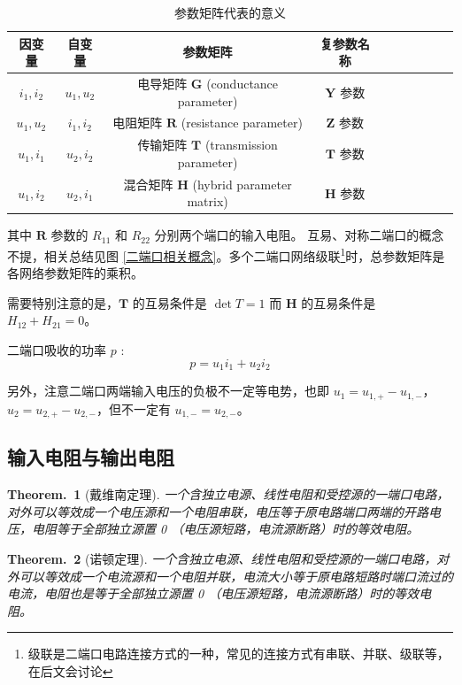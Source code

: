 \documentclass[UTF8]{report}
\theoremstyle{MyLineTheoremStyle} %
\newtheorem{LineTheorem}{Theorem.\,}
\theoremstyle{MyBlockTheoremStyle} %
\theoremstyle{MySubsubsectionStyle} %
\begin{document}
\begin{table}[H]\centering
    \caption{参数矩阵代表的意义}
    \label{参数矩阵代表的意义}
\begin{tabular}{cccccccccc}\toprule
    因变量& 自变量 & 参数矩阵 & 复参数名称\\
    \midrule
    $i_1, i_2$ & $u_1, u_2$ & 电导矩阵 $\boldsymbol{G}$ (conductance parameter) & $\boldsymbol{Y}$ 参数\\
    $u_1, u_2$ & $i_1, i_2$ & 电阻矩阵 $\boldsymbol{R}$ (resistance parameter) & $\boldsymbol{Z}$ 参数\\
    $u_1, i_1$& $u_2, i_2$&  传输矩阵 $\boldsymbol{T}$ (transmission parameter) & $\boldsymbol{T}$ 参数\\
    $u_1, i_2$& $u_2, i_1$&  混合矩阵 $\boldsymbol{H}$ (hybrid parameter matrix) & $\boldsymbol{H}$ 参数\\
    \bottomrule
\end{tabular}
\end{table}

其中 $\boldsymbol{R}$ 参数的 $R_{11}$ 和 $R_{22}$ 分别两个端口的输入电阻。
互易、对称二端口的概念不提，相关总结见图 \ref{二端口相关概念}。多个二端口网络级联\footnote{级联是二端口电路连接方式的一种，常见的连接方式有串联、并联、级联等，在后文会讨论}时，总参数矩阵是各网络参数矩阵的乘积。

需要特别注意的是，$\boldsymbol{T}$ 的互易条件是 $\det T = 1$ 而 $\boldsymbol{H}$ 的互易条件是 $H_{12} + H_{21} = 0$。

二端口吸收的功率 $p$ :
\begin{equation}
    \boxed{
        p = u_1i_1 + u_2i_2
    }
\end{equation}

另外，注意二端口两端输入电压的负极不一定等电势，也即 $u_1 = u_{1,+} - u_{1,-}$，$u_2 = u_{2,+} - u_{2,-}$，但不一定有 $u_{1,-} = u_{2,-}$。

\subsection{输入电阻与输出电阻}
\begin{LineTheorem}[戴维南定理]
一个含独立电源、线性电阻和受控源的一端口电路，对外可以等效成一个电压源和一个电阻串联，电压等于原电路端口两端的开路电压，电阻等于全部独立源置 0 （电压源短路，电流源断路）时的等效电阻。
\end{LineTheorem}

\begin{LineTheorem}[诺顿定理]
一个含独立电源、线性电阻和受控源的一端口电路，对外可以等效成一个电流源和一个电阻并联，电流大小等于原电路短路时端口流过的电流，电阻也是等于全部独立源置 0 （电压源短路，电流源断路）时的等效电阻。
\end{LineTheorem}
\end{document}

